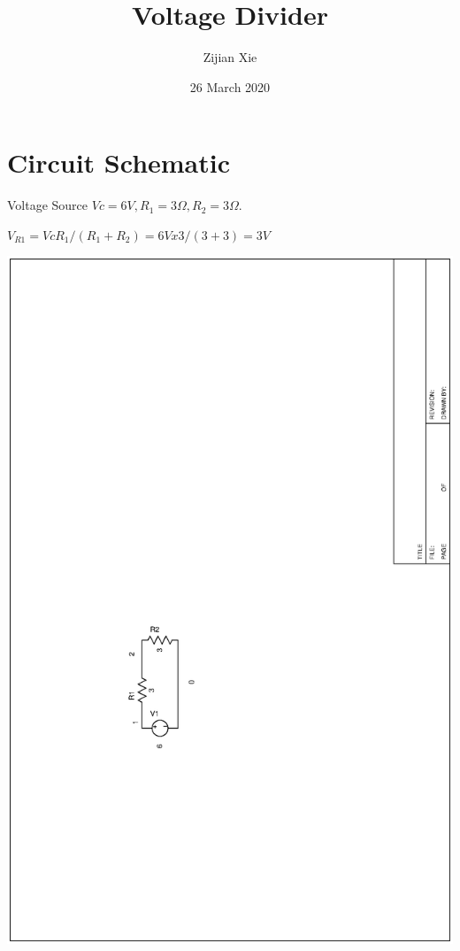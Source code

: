 \documentclass{article}
\title{Voltage Divider}
\author{Zijian Xie}
\date{26 March 2020}
\begin{document}
\maketitle

\section{Circuit Schematic}
Voltage Source $Vc = 6V, R_1 = 3Ω, R_2 = 3Ω$.

$V_{R1} = Vc R_1/(R_1+R_2) = 6V x 3/(3+3) = 3V$

\includegraphics[width=\textwidth, angle=-90]{01.ps}
\end{document}
